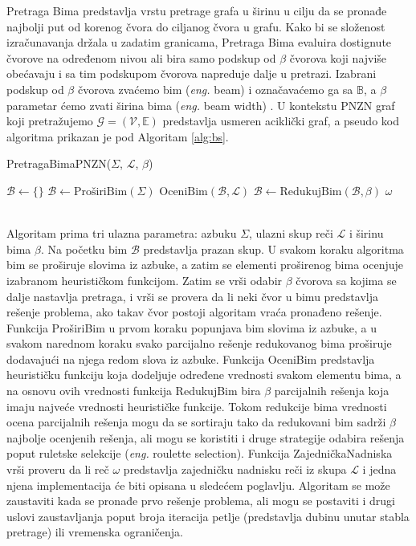 \documentclass[12pt,oneside]{memoir}
\begin{document}
Pretraga Bima predstavlja vrstu pretrage grafa u širinu u cilju da
se pronađe najbolji put od korenog čvora do ciljanog čvora u grafu. Kako bi se složenost izračunavanja držala u
zadatim granicama, Pretraga Bima evaluira dostignute čvorove na određenom nivou ali bira samo podskup od $\beta$
čvorova koji najviše obećavaju i sa tim podskupom čvorova napreduje dalje u pretrazi. Izabrani podskup od $\beta$ čvorova
zvaćemo bim (\textit{eng.} beam) i označavaćemo ga sa $\mathbb{B}$, a $\beta$ parametar ćemo zvati širina bima (\textit{eng.} beam width) \cite{SCSBS}.
U kontekstu PNZN graf koji pretražujemo $\mathcal{G}=(\mathcal{V},\mathbb{E})$ predstavlja usmeren aciklički graf, a  
pseudo kod algoritma prikazan je pod Algoritam \ref{alg:bs}.
\\
\begin{algorithm}
  \caption{PretragaBimaPNZN($\Sigma$, $\mathcal{L}$, $\beta$)}
  \label{alg:bs}
  \begin{algorithmic}[1]
  \State $\mathcal{B} \gets \{ \}$
   
  \State $\mathcal{B} \gets \textrm{ProširiBim}(\Sigma)$
  \State $\textrm{OceniBim}(\mathcal{B}, \mathcal{L})$
  \State $\mathcal{B} \gets \textrm{RedukujBim}(\mathcal{B}, \beta)$
    \State \Return $\omega$
    \EndIf
  \EndFor
  \EndWhile
  \end{algorithmic}
  \end{algorithm}
\\
Algoritam prima tri ulazna parametra: azbuku $\Sigma$, ulazni skup reči $\mathcal{L}$ i širinu bima $\beta$.
Na početku bim $\mathcal{B}$ predstavlja prazan skup. U svakom koraku algoritma bim se proširuje slovima iz azbuke,
a zatim se elementi proširenog bima ocenjuje izabranom heurističkom funkcijom. Zatim se vrši odabir $\beta$ čvorova
sa kojima se dalje nastavlja pretraga, i vrši se provera da li neki čvor u bimu predstavlja rešenje problema,
ako takav čvor postoji algoritam vraća pronađeno rešenje. Funkcija ProširiBim u prvom koraku popunjava bim slovima
iz azbuke, a u svakom narednom koraku svako parcijalno rešenje redukovanog bima proširuje dodavajući na njega redom
slova iz azbuke. Funkcija OceniBim predstavlja heurističku funkciju koja dodeljuje određene vrednosti svakom elementu bima,
a na osnovu ovih vrednosti funkcija RedukujBim bira $\beta$ parcijalnih rešenja koja imaju najveće vrednosti
heurističke funkcije. Tokom redukcije bima vrednosti ocena parcijalnih rešenja mogu da se sortiraju tako da redukovani
bim sadrži $\beta$ najbolje ocenjenih rešenja, ali mogu se koristiti i druge strategije odabira rešenja poput ruletske
selekcije (\textit{eng.} roulette selection). Funkcija ZajedničkaNadniska vrši proveru da li reč $\omega$
predstavlja zajedničku nadnisku reči iz skupa $\mathcal{L}$ i jedna njena implementacija će biti opisana u sledećem poglavlju.
Algoritam se može zaustaviti kada se pronađe prvo rešenje problema, ali mogu se postaviti i drugi uslovi zaustavljanja
poput broja iteracija petlje (predstavlja dubinu unutar stabla pretrage) ili vremenska ograničenja.
\end{document}
